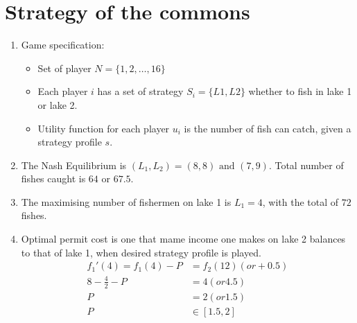 \documentclass{article}
\begin{document}
\section{Strategy of the commons}
\begin{enumerate}
  \item Game specification:
  \begin{itemize}
    \item Set of player $N = \{1,2,\dots,16\}$
    \item Each player $i$ has a set of strategy $S_i = \{L1, L2\}$ whether to fish in lake 1 or lake 2.
    \item Utility function for each player $u_i$ is the number of fish can catch, given a strategy profile $s$.
  \end{itemize}
\item The Nash Equilibrium is $(L_1,L_2) = (8,8) \text{ and } (7, 9)$. Total number of fishes caught is $64$ or $67.5$.
  \item The maximising number of fishermen on lake 1 is $L_1 = 4$, with the total of $72$ fishes.
  \item Optimal permit cost is one that mame income one makes on lake 2 balances to that of lake 1, when desired strategy profile is played.
  \begin{align*}
    f_1'(4) = f_1(4) - P &= f_2(12) (or +0.5)\\
    8 - \frac{4}{2} - P &= 4 (or 4.5)\\
    P &= 2 (or 1.5) \\
    P &\in [1.5, 2]
  \end{align*}
\end{enumerate}

\end{document}

